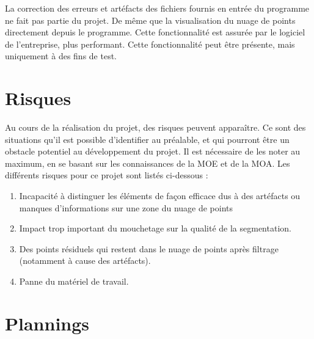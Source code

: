 \documentclass[12pt,titlepage,french]{article}
\begin{document}
La correction des erreurs et artéfacts des fichiers fournis en entrée du programme ne fait pas partie du projet.
De même que la visualisation du nuage de points directement depuis le programme. Cette fonctionnalité est assurée par le logiciel de l'entreprise, plus performant. Cette fonctionnalité peut être présente, mais uniquement à des fins de test.

\section{Risques}

Au cours de la réalisation du projet, des risques peuvent apparaître. Ce sont des situations qu'il est possible d'identifier au préalable, et qui pourront être un obstacle potentiel au développement du projet. Il est nécessaire de les noter au maximum, en se basant sur les connaissances de la MOE et de la MOA. Les différents risques pour ce projet sont listés ci-dessous :
\begin{enumerate}
\item Incapacité à distinguer les éléments de façon efficace dus à des artéfacts ou manques d'informations sur une zone du nuage de points
\item Impact trop important du mouchetage sur la qualité de la segmentation.
\item Des points résiduels qui restent dans le nuage de points après filtrage (notamment à cause des artéfacts).
\item Panne du matériel de travail.
\end{enumerate}

\section{Plannings}
\end{document}
